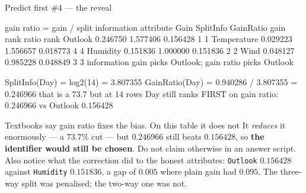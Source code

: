 \documentclass[aspectratio=169]{beamer}
\begin{document}
\begin{frame}[fragile,shrink=8]{Predict first \#4 --- the reveal}
\begin{outblk}
gain ratio = gain / split information
attribute      Gain      SplitInfo   GainRatio   gain rank  ratio rank
Outlook       0.246750   1.577406    0.156428      1          1
Temperature   0.029223   1.556657    0.018773      4          4
Humidity      0.151836   1.000000    0.151836      2          2
Wind          0.048127   0.985228    0.048849      3          3
information gain picks Outlook; gain ratio picks Outlook
\end{outblk}
\begin{outblk}
SplitInfo(Day) = log2(14) = 3.807355
GainRatio(Day) = 0.940286 / 3.807355 = 0.246966
that is a 73.7%
but at 14 rows Day still ranks FIRST on gain ratio: 0.246966 vs Outlook 0.156428
\end{outblk}
\begin{alertblock}{Textbooks say gain ratio fixes the bias. On this table it does not}
  \footnotesize It \emph{reduces} it enormously --- a $73.7\%$ cut --- but
  $0.246966$ still beats $0.156428$, so \textbf{the identifier would still be
  chosen}. Do not claim otherwise in an answer script. Also notice what the
  correction did to the honest attributes: \texttt{Outlook} $0.156428$ against
  \texttt{Humidity} $0.151836$, a gap of $0.005$ where plain gain had $0.095$.
  The three-way split was penalised; the two-way one was not.
\end{alertblock}
\end{frame}
\end{document}
